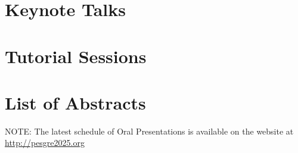 \documentclass[openany, twoside, parskip=half, 12pt, a4, BCOR=2cm, open=any]{scrbook}
\begin{document}
\chapter{Keynote Talks}


\chapter{Tutorial Sessions}



\chapter{List of Abstracts}

\begin{center}
	\Large NOTE: The latest schedule of Oral Presentations is available on the website at \url{http://pesgre2025.org}
\end{center}





%
%
%
%
%
%

%


%

%
%
%
%
%
%
%
%
%
%
%
\end{document}
